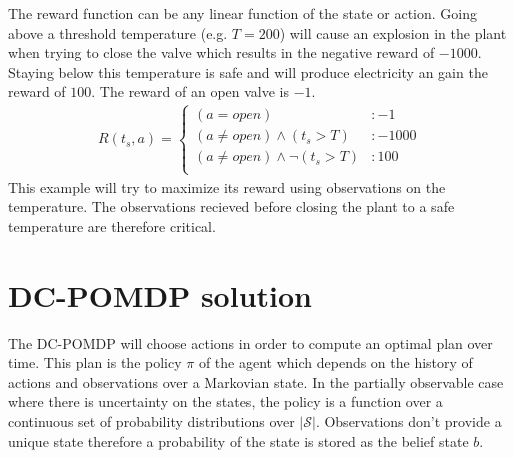\documentclass{article}
\begin{document}
The reward function can be any linear function of the state or action. Going above a threshold temperature (e.g. $T=200$) will cause an explosion in the plant when trying to close the valve which results in the negative reward of $-1000$. Staying below this temperature is safe and will produce electricity an gain the reward of $100$. The reward of an open valve is $-1$.
\begin{align}
R(t_s,a) = 
\begin{cases}
 (a=open) &: -1 \\
(a \neq open)\wedge (t_s>T) &: -1000 \\
(a \neq open)\wedge \neg(t_s>T) &: 100 \\
\end{cases}\nonumber
\end{align}
This example will try to maximize its reward using observations on the temperature. The observations recieved before closing the plant to a safe temperature are therefore critical. 

\section{DC-POMDP solution}
The DC-POMDP will choose actions in order to compute an optimal plan over time. This plan is the policy $\pi$ of the agent which depends on the history of actions and observations over a Markovian state. In the partially observable case where there is uncertainty on the states, the policy is a function over a continuous set of probability distributions over $|\mathcal{S}|$. Observations don't provide a unique state therefore a probability of the state is stored as the belief state $b$.
\end{document}
